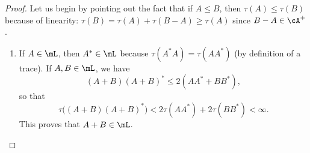 \begin{proof}
    Let us begin by pointing out the fact that if $A\leq B$, then $\tau(A)\leq\tau(B)$ because of linearity: $\tau(B)=\tau(A)+\tau(B-A)\geq\tau(A)$ since $B-A\in\cA^+$.

    \begin{enumerate}
        \item
            If $A\in\mL$, then $A^*\in\mL$ because $\tau(A^*A)=\tau(AA^*)$ (by definition of a trace). If $A,B\in\mL$, we have
            \begin{equation}
                (A+B)(A+B)^*\leq 2(AA^*+BB^*),
            \end{equation}
            so that
            \begin{equation}
                \tau\big( (A+B)(A+B)^* \big)<2\tau(AA^*)+2\tau(BB^*)<\infty.
            \end{equation}
            This proves that $A+B\in\mL$.


\end{enumerate}
\end{proof}
